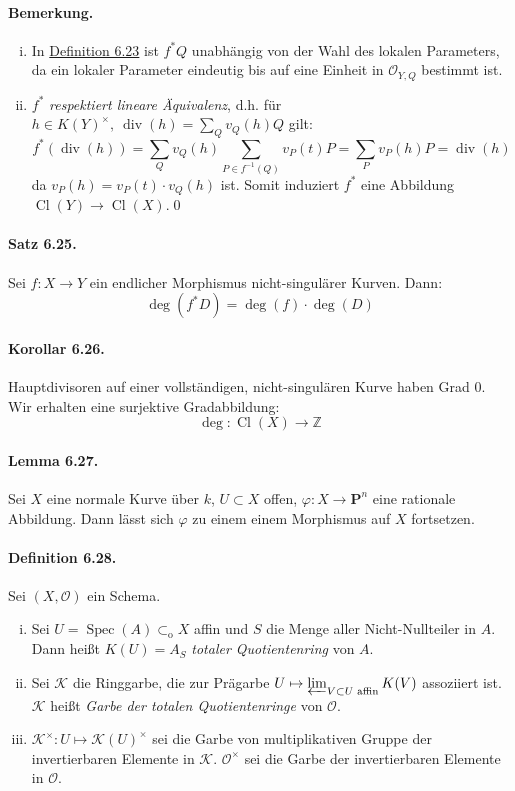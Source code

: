 \paragraph{Bemerkung.} \begin{enumerate}[(i)]
\item In \hyperref[6.23]{Definition 6.23} ist $f^\ast Q$ unabhängig von der Wahl des lokalen Parameters, da ein lokaler Parameter eindeutig bis auf eine Einheit in $\mathcal{O}_{Y,Q}$ bestimmt ist.
\item $f^\ast$ \textit{respektiert lineare Äquivalenz}, d.h. für $h\in K(Y)^\times,\ \operatorname{div}(h)=\sum_Qv_Q(h)Q$ gilt:
\[f^\ast(\operatorname{div}(h))=\sum_Qv_Q(h)\sum_{P\in f^{-1}(Q)}v_P(t)P=\sum_Pv_P(h)P=\operatorname{div}(h) \]
da $v_P(h)=v_P(t)\cdot v_Q(h)$ ist. Somit induziert $f^\ast$ eine Abbildung $\operatorname{Cl}(Y)\to\operatorname{Cl}(X)$.\qed
\end{enumerate}

\paragraph{Satz 6.25.}\label{6.25} Sei $f:X\to Y$ ein endlicher Morphismus nicht-singulärer Kurven. Dann:
\[\deg(f^\ast D)=\deg(f)\cdot \deg(D) \]

\paragraph{Korollar 6.26.}\label{6.26} Hauptdivisoren auf einer vollständigen, nicht-singulären Kurve haben Grad $0$. Wir erhalten eine surjektive Gradabbildung:
\[\deg:\operatorname{Cl}(X)\to\mathbb{Z} \]

\paragraph{Lemma 6.27.}\label{6.27} Sei $X$ eine normale Kurve über $k$, $U\subset X$ offen, $\varphi:X\to\mathbf{P}^n$ eine rationale Abbildung. Dann lässt sich $\varphi$ zu einem einem Morphismus auf $X$ fortsetzen.

\paragraph{Definition 6.28.}\label{6.28} Sei $(X,\mathcal{O})$ ein Schema.
\begin{enumerate}[(i)]
\item Sei $U=\operatorname{Spec}(A)\subset_\text{o}X$ affin und $S$ die Menge aller Nicht-Nullteiler in $A$. Dann heißt $K(U)=A_S$ \textit{totaler Quotientenring} von $A$.
\item Sei $\mathcal{K}$ die Ringgarbe, die zur Prägarbe $U\mapsto\varprojlim_{V\subset U\text{ affin}} K(V)$ assoziiert ist. $\mathcal{K}$ heißt \textit{Garbe der totalen Quotientenringe} von $\mathcal{O}$.
\item $\mathcal{K}^\times:U\mapsto \mathcal{K}(U)^\times$ sei die Garbe von multiplikativen Gruppe der invertierbaren Elemente in $\mathcal{K}$. $\mathcal{O}^\times$ sei die Garbe der invertierbaren Elemente in $\mathcal{O}$.
\end{enumerate}

